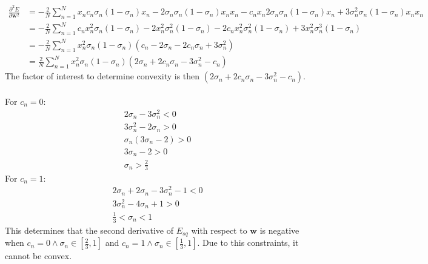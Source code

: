 \documentclass[fleqn]{article}
\renewcommand{\vec}[1]{\mathbf{#1}}
\begin{document}
\begin{equation}
    \begin{split}
        \frac{\partial^2E}{\partial \vec{w}^2} & =
        - \frac{2}{N} \sum_{n=1}^{N}
        x_n c_n \sigma_n (1 - \sigma_n) x_n - 2 \sigma_n \sigma_n (1 - \sigma_n) x_n x_n - c_n x_n 2 \sigma_n \sigma_n (1 - \sigma_n) x_n + 3 \sigma_n^2 \sigma_n (1 - \sigma_n) x_n x_n \\
        & = - \frac{2}{N} \sum_{n=1}^{N}
        c_n x_n^2 \sigma_n (1 - \sigma_n) - 2 x_n^2 \sigma_n^2 (1 - \sigma_n)
        - 2 c_n x_n^2 \sigma_n^2 (1 - \sigma_n) + 3 x_n^2 \sigma_n^3 (1 - \sigma_n) \\
        & = - \frac{2}{N} \sum_{n=1}^{N}
        x_n^2 \sigma_n (1 - \sigma_n) (c_n - 2 \sigma_n - 2 c_n \sigma_n + 3 \sigma_n^2) \\
        & = \frac{2}{N} \sum_{n=1}^{N}
        x_n^2 \sigma_n (1 - \sigma_n) (2 \sigma_n + 2 c_n \sigma_n - 3 \sigma_n^2 - c_n)
    \end{split}
\end{equation}
The factor of interest to determine convexity is then $(2 \sigma_n + 2 c_n \sigma_n - 3 \sigma_n^2 - c_n)$.\\ \ \\For $c_n = 0$:
\begin{equation}
    \begin{split}
        2 \sigma_n - 3\sigma_n ^ 2 < 0 \\
        3\sigma_n ^ 2 - 2 \sigma_n > 0 \\
        \sigma_n (3 \sigma_n - 2) > 0 \\
        3 \sigma_n - 2 > 0 \\
        \sigma_n > \frac{2}{3}
    \end{split}
\end{equation}
For $c_n = 1$:
\begin{equation}
    \begin{split}
        2\sigma_n + 2\sigma_n - 3\sigma_n^2 - 1 < 0 \\
        3\sigma_n^2 - 4\sigma_n + 1 > 0 \\
        \frac{1}{3} < \sigma_n < 1
    \end{split}
\end{equation}
This determines that the second derivative of $E_{sq}$ with respect to $\vec{w}$ is negative when $c_n = 0 \land \sigma_n \in [\frac{2}{3}, 1]$ and $c_n = 1 \land \sigma_n \in [\frac{1}{3}, 1]$. Due to this constraints, it cannot be convex.
\end{document}
